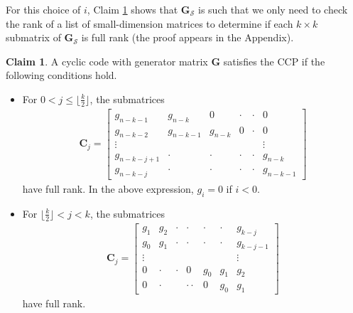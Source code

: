 \documentclass[journal,twocolumn]{IEEEtran}
\theoremstyle{definition}
\newtheorem{claim}{Claim}
\newcommand{\calS}{\mathcal{S}}
\newcommand{\bfg}{\mathbf{g}}
\newcommand{\bfG}{\mathbf{G}}
\newcommand{\bfC}{\mathbf{C}}
\begin{document}

For this choice of $i$, Claim \ref{claim:cyclic_MDS} shows that $\bfG_\calS$ is such that we only need to check the rank of a list of small-dimension matrices to determine if each $k\times k$ submatrix of $\bfG_\calS$ is full rank (the proof appears in the Appendix).

\begin{claim}
	\label{claim:cyclic_MDS}
	A cyclic code with generator matrix $\bfG$ satisfies the CCP if the following conditions hold.
\begin{itemize}
	\item
	For $0<j\le \lfloor \frac{k}{2}\rfloor$, the submatrices
	\begin{align*}
    \bfC_j =\begin{bmatrix}
	g_{n-k-1}&g_{n-k}&0&\cdot&\cdot&0\\
	g_{n-k-2}&g_{n-k-1}&g_{n-k}&0&\cdot&0\\
	\vdots&&&&&\vdots\\
	g_{n-k-j+1}&\cdot&\cdot&\cdot&\cdot&g_{n-k}\\
	g_{n-k-j}&\cdot&\cdot&\cdot&\cdot&g_{n-k-1}
	\end{bmatrix}
	\end{align*}
	have full rank. In the above expression, $g_i=0$ if $i<0$.
	\item
	For $\lfloor\frac{k}{2}\rfloor<j<k$, the submatrices
		\begin{align*}
		\bfC_j =\begin{bmatrix}
		g_{1}&g_{2}&\cdot&\cdot&\cdot&\cdot&g_{k-j}\\
		g_{0}&g_{1}&\cdot&\cdot&\cdot&\cdot&g_{k-j-1}\\
		\vdots&&&&&&\vdots\\
		0&\cdot&\cdot&0&g_0&g_1&g_2\\
		0&\cdot&&\cdot\cdot&0&g_0&g_1
		\end{bmatrix}
		\end{align*}
	have full rank.
\end{itemize}
\end{claim}
\end{document}
